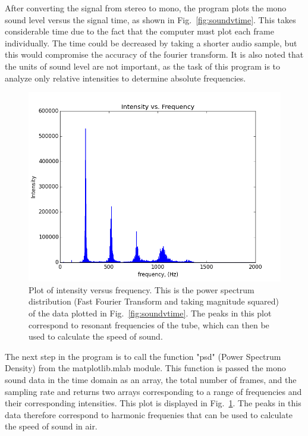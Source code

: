 \documentclass[12pt]{article}
\begin{document}
After converting the signal from stereo to mono, the program plots the mono
sound level versus the signal time, as shown in Fig.~\ref{fig:soundvtime}.
This takes considerable time due to the fact that
the computer must plot each frame individually. The time could be decreased
by taking a shorter audio sample, but this would compromise the accuracy of the
fourier transform. It is also noted that the units of sound level are not
important, as the task of this program is to analyze only relative intensities
to determine absolute frequencies.

\begin{figure}[h]
\begin{center}
\includegraphics[width=300bp]{noise2_psd.png}
\vspace{-18bp}
\end{center}
\caption[]{\label{fig:psd}\small
Plot of intensity versus frequency. This is the power spectrum distribution
(Fast Fourier Transform and taking magnitude squared) of the data plotted in 
Fig.~\ref{fig:soundvtime}. The peaks in this plot correspond to resonant
frequencies of the tube, which can then be used to calculate the speed of sound.
}
\end{figure}

The next step in the program is to call the function "psd" 
(Power Spectrum Density) from the matplotlib.mlab module. This function is 
passed the mono sound data in the time domain as an array, the total number
of frames, and the sampling rate and returns two arrays corresponding to a 
range of frequencies and their
corresponding intensities. This plot is displayed in Fig.~\ref{fig:psd}.
The peaks in this data therefore correspond to harmonic frequenies that can be
used to calculate the speed of sound in air.
\end{document}
